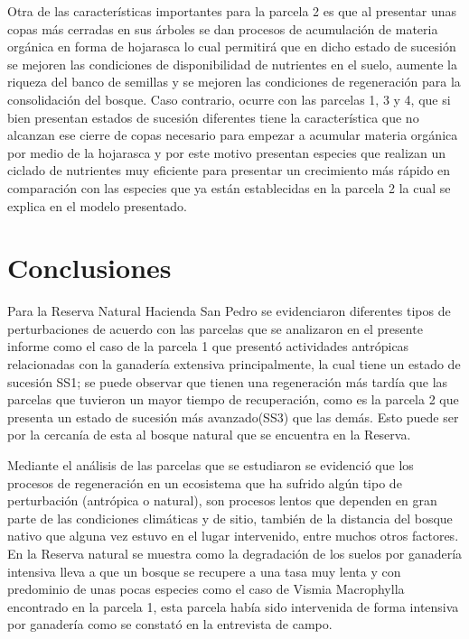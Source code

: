 \documentclass[letterpaper,9pt,onecolumn,twoside,]{pinp}
\begin{document}
Otra de las características importantes para la parcela 2 es que al
presentar unas copas más cerradas en sus árboles se dan procesos de
acumulación de materia orgánica en forma de hojarasca lo cual permitirá
que en dicho estado de sucesión se mejoren las condiciones de
disponibilidad de nutrientes en el suelo, aumente la riqueza del banco
de semillas y se mejoren las condiciones de regeneración para la
consolidación del bosque. Caso contrario, ocurre con las parcelas 1, 3 y
4, que si bien presentan estados de sucesión diferentes tiene la
característica que no alcanzan ese cierre de copas necesario para
empezar a acumular materia orgánica por medio de la hojarasca y por este
motivo presentan especies que realizan un ciclado de nutrientes muy
eficiente para presentar un crecimiento más rápido en comparación con
las especies que ya están establecidas en la parcela 2 la cual se
explica en el modelo presentado.

\hypertarget{conclusiones}{%
\section{Conclusiones}\label{conclusiones}}

Para la Reserva Natural Hacienda San Pedro se evidenciaron diferentes tipos de perturbaciones de acuerdo con las parcelas que se analizaron en el presente informe como el caso de la parcela 1 que presentó actividades antrópicas relacionadas con la ganadería extensiva principalmente, la cual tiene un estado de sucesión SS1; se puede observar que tienen una regeneración más tardía que las parcelas que tuvieron un mayor tiempo de recuperación, como es la parcela 2 que presenta un estado de sucesión más avanzado(SS3) que las demás. Esto puede ser por la cercanía de esta al bosque natural que se encuentra en la Reserva.  

Mediante el análisis de las parcelas que se estudiaron se evidenció que los procesos de regeneración en un ecosistema que ha sufrido algún tipo de perturbación (antrópica o natural), son procesos lentos que dependen en gran parte de las condiciones climáticas y de sitio, también de la distancia del bosque nativo que alguna vez estuvo en el lugar intervenido, entre muchos otros factores. En la Reserva natural se muestra como la degradación de los suelos por ganadería intensiva lleva  a que un bosque se recupere a una tasa muy lenta y con predominio de unas pocas especies como el caso de Vismia Macrophylla encontrado en la parcela 1, esta parcela había sido intervenida de forma intensiva por ganadería como se constató en la entrevista de campo. 
\end{document}

